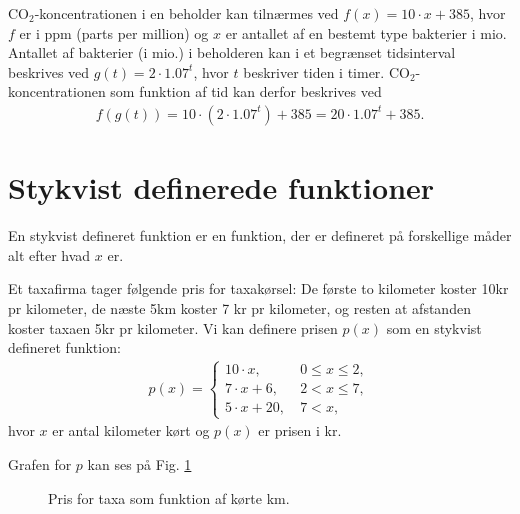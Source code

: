 \begin{exa}
CO$_2$-koncentrationen i en beholder kan tilnærmes ved $f(x) = 10\cdot x+385$, hvor $f$ er i ppm (parts per million) og $x$ er antallet af en bestemt type bakterier i mio. Antallet af bakterier (i mio.) i beholderen kan i et begrænset tidsinterval beskrives ved $g(t)= 2\cdot 1.07^t$, hvor $t$ beskriver tiden i timer. CO$_2$-koncentrationen som funktion af tid kan derfor beskrives ved
\begin{align*}
f(g(t)) = 10\cdot (2\cdot 1.07^t) + 385 = 20\cdot 1.07^t + 385.
\end{align*}
\section*{Stykvist definerede funktioner}
En stykvist defineret funktion er en funktion, der er defineret på forskellige måder alt efter hvad $x$ er.
\begin{exa}
Et taxafirma tager følgende pris for taxakørsel: De første to kilometer koster 10kr pr kilometer, de næste 5km koster 7 kr pr kilometer, og resten at afstanden koster taxaen 5kr pr kilometer. Vi kan definere prisen $p(x)$ som en stykvist defineret funktion:
\begin{align*}
p(x)=
\begin{cases}
10\cdot x, \ &0\leq x \leq 2,\\
7\cdot x + 6,\ &2 < x \leq 7,\\
5 \cdot x + 20,\ &7<x,
\end{cases}
\end{align*}
hvor $x$ er antal kilometer kørt og $p(x)$ er prisen i kr. 
\end{exa}
Grafen for $p$ kan ses på Fig. \ref{fig:stykvis}
\begin{figure}[H]
\centering
{}
\caption{Pris for taxa som funktion af kørte km.}
\label{fig:stykvis}
\end{figure}
\end{exa}
